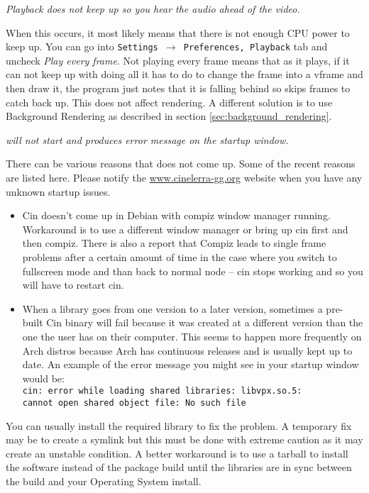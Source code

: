 \textit{Playback does not keep up so you hear the audio ahead of the video.}

When this occurs, it most likely means that there is not enough CPU power to keep up. You can go into \texttt{Settings $\rightarrow$ Preferences, Playback} tab and uncheck \textit{Play every frame}. Not playing every frame means that as it plays, if it can not keep up with doing all it has to do to change the frame into a vframe and then draw it, the program just notes that it is falling behind so skips frames to catch back up. This does not affect rendering. A different solution is to use Background Rendering as described in section \ref{sec:background_rendering}.
\bigskip

\textit{\CGG{} will not start and produces error message on the startup window.}

There can be various reasons that \CGG{} does not come up. Some of the recent reasons are listed here. Please notify the {\small \href{http://www.cinelerra-gg.org/}{www.cinelerra-gg.org}} website when you have any unknown startup issues.
\medskip

\begin{itemize}[nosep]
	\item Cin doesn't come up in Debian with compiz window manager running. Workaround is to use a different window manager or bring up cin first and then compiz. There is also a report that Compiz leads to single frame problems after a certain amount of time in the case where you switch to fullscreen mode and than back to normal node -- cin stops working and so you will have to restart cin.
	\item When a library goes from one version to a later version, sometimes a pre-built Cin binary will fail because it was created at a different version than the one the user has on their computer. This seems to happen more frequently on Arch distros because Arch has continuous releases and is usually kept up to date. An example of the error message you might see in your startup window would be:\\
	\texttt{cin: error while loading shared libraries: libvpx.so.5: \\
	cannot open shared object file: No such file}
\end{itemize}
\medskip

You can usually install the required library to fix the problem. A temporary fix may be to create a symlink but this must be done with extreme caution as it may create an unstable condition. A better workaround is to use a tarball to install the software instead of the package build until the libraries are in sync between the build and your Operating System install.
\bigskip

